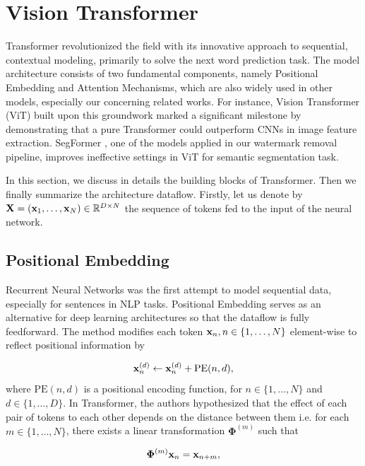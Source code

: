 \section{Vision Transformer}
\label{section:transformer}
Transformer \cite{vaswani2017attention} revolutionized the field with its innovative approach to sequential, contextual modeling, primarily to solve the next word prediction task. The model architecture consists of two fundamental components, namely Positional Embedding and Attention Mechanisms, which are also widely used in other models, especially our concerning related works. For instance, Vision Transformer (ViT) built upon this groundwork \cite{dosovitskiy2020image} marked a significant milestone by demonstrating that a pure Transformer could outperform CNNs in image feature extraction. SegFormer \cite{xie2021segformer}, one of the models applied in our watermark removal pipeline, improves ineffective settings in ViT for semantic segmentation task.

In this section, we discuss in details the building blocks of Transformer. Then we finally summarize the architecture dataflow. Firstly, let us denote by $\mathbf{X}=(\mathbf{x}_1,\ldots, \mathbf{x}_N)\in\mathbb{R}^{D\times N}$ the sequence of tokens fed to the input of the neural network.

\subsection{Positional Embedding}
Recurrent Neural Networks \cite{rumelhart1986learning} was the first attempt to model sequential data, especially for sentences in NLP tasks. Positional Embedding serves as an alternative for deep learning architectures so that the dataflow is fully feedforward. The method modifies each token $\mathbf{x}_n, n\in\{1,\ldots,N\}$ element-wise to reflect positional information by

\begin{equation}
  \mathbf{x}_n^{(d)} \leftarrow \mathbf{x}_n^{(d)} + \mathrm{PE}(n,d),
\end{equation}
where $\mathrm{PE}(n,d)$ is a positional encoding function, for $n\in\{1,\ldots,N\}$ and $d\in\{1,\ldots,D\}$. In Transformer, the authors hypothesized that the effect of each pair of tokens to each other depends on the distance between them i.e. for each $m\in\{1,\ldots,N\}$, there exists a linear transformation $\bm{\Phi}^{(m)}$ such that

\begin{equation}
  \bm{\Phi}^{(m)}\mathbf{x}_n = \mathbf{x}_{n+m},
\end{equation}

